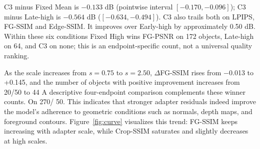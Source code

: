 \documentclass[times,twocolumn,final]{elsarticle}
\providecommand{\DIFadd}[1]{{\protect\color{blue} \sf #1}} %
\providecommand{\DIFdel}[1]{{\protect\color{red} \scriptsize #1}} %
\providecommand{\DIFaddbegin}{} %
\providecommand{\DIFaddend}{} %
\providecommand{\DIFdelbegin}{} %
\providecommand{\DIFdelend}{} %
\begin{document}
\DIFdelend \DIFaddbegin \DIFadd{C3 minus Fixed Mean is $-0.133$ dB (pointwise interval $[-0.170,-0.096]$); C3 minus Late-high is $-0.564$ dB ($[-0.634,-0.494]$). C3 also trails both on LPIPS, FG-SSIM and Edge-SSIM. It improves over Early-high by approximately 0.50 dB. Within these six conditions Fixed High wins FG-PSNR on 172 objects, Late-high on 64, and C3 on none; this is an endpoint-specific count, not a universal quality ranking.
}\DIFaddend 

\DIFdelbegin \DIFdel{As the scale increases from $s = 0.75$ to $s = 2.50$, $\Delta$FG-SSIM rises from $-$0.013 to +0.145, and the number of objects with positive improvement increases from 20/50 to 44}\DIFdelend \DIFaddbegin \DIFadd{A descriptive four-endpoint comparison complements these winner counts. On 270}\DIFaddend /\DIFdelbegin \DIFdel{50. This indicates that stronger adapter residuals indeed improve the model's adherence to geometric conditions such as normals, depth maps, and foreground contours. Figure~\ref{fig:curve} visualizes this trend: FG-SSIM keeps increasing with adapter scale, while Crop-SSIM saturates and slightly decreases at high scales.
}%
\end{document}
